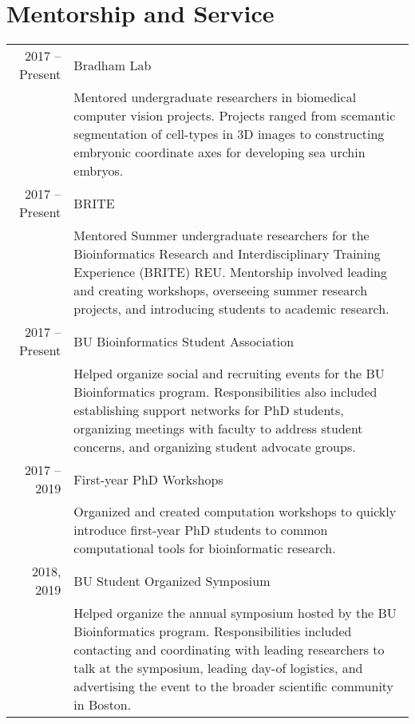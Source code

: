 \documentclass[a4paper,10pt]{article}
\begin{document}
\section{\color{linkcolour} Mentorship and Service}
\begin{tabular}{rp{10cm}}
2017 -- Present
	& Bradham Lab \\
	& \footnotesize{Mentored undergraduate researchers in biomedical computer vision projects. Projects ranged from scemantic segmentation of cell-types in 3D
			 images to constructing embryonic coordinate axes for developing
			 sea urchin embryos.} \\
2017 -- Present
	& BRITE \\
	& \footnotesize{Mentored Summer undergraduate researchers for the
		Bioinformatics Research and Interdisciplinary Training Experience (BRITE)
		REU. Mentorship involved leading and creating workshops, overseeing
		summer research projects, and introducing students to academic research.} \\
2017 -- Present
	& BU Bioinformatics Student Association \\
	& \footnotesize{Helped organize social and recruiting events for the BU
		Bioinformatics program. Responsibilities also included establishing
		support networks for PhD students, organizing meetings with faculty to 
		address student concerns, and organizing student advocate groups.} \\
2017 -- 2019
	& First-year PhD Workshops \\
	& \footnotesize{Organized and created computation workshops to quickly
					introduce first-year PhD students to common computational
					tools for bioinformatic research.} \\
2018, 2019
	& BU Student Organized Symposium \\
	& \footnotesize{Helped organize the annual symposium hosted by the BU
	  Bioinformatics program. Responsibilities included contacting and
	  coordinating with leading researchers to talk at the symposium,
	  leading day-of logistics, and advertising the event to the broader
	  scientific community in Boston.} \\

\end{tabular}

\end{document}
